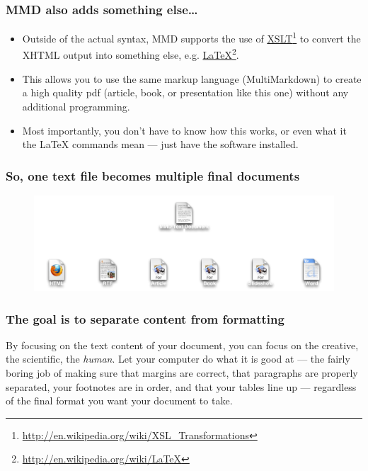 \begin{frame}

\frametitle{MMD also adds something else{\ldots}}
\label{mmdalsoaddssomethingelse}

\begin{itemize}
\item Outside of the actual syntax, MMD supports the use of
 \href{http://en.wikipedia.org/wiki/XSL_Transformations}{XSLT}\footnote{\href{http://en.wikipedia.org/wiki/XSL_Transformations}{http:\slash \slash en.wikipedia.org\slash wiki\slash XSL\_Transformations}} to convert the
 XHTML output into something else, e.g.
 \href{http://en.wikipedia.org/wiki/LaTeX}{LaTeX}\footnote{\href{http://en.wikipedia.org/wiki/LaTeX}{http:\slash \slash en.wikipedia.org\slash wiki\slash LaTeX}}.

\item This allows you to use the same markup language (MultiMarkdown) to create a
 high quality pdf (article, book, or presentation like this one) without any
 additional programming.

\item Most importantly, you don't have to know how this works, or even what it
 the LaTeX commands mean --- just have the software installed.

\end{itemize}

\end{frame}

\begin{frame}

\frametitle{So, one text file becomes multiple final documents}
\label{soonetextfilebecomesmultiplefinaldocuments}

\begin{figure}[htbp]
\centering
\includegraphics[keepaspectratio,width=\textwidth,height=0.75\textheight]{MMDTree.pdf}
\label{}
\end{figure}


\end{frame}

\begin{frame}

\frametitle{The goal is to separate content from formatting}
\label{thegoalistoseparatecontentfromformatting}

By focusing on the text content of your document, you can focus on the
creative, the scientific, the \emph{human}. Let your computer do what it is good at
--- the fairly boring job of making sure that margins are correct, that
paragraphs are properly separated, your footnotes are in order, and that your
tables line up --- regardless of the final format you want your document to
take.

\end{frame}

